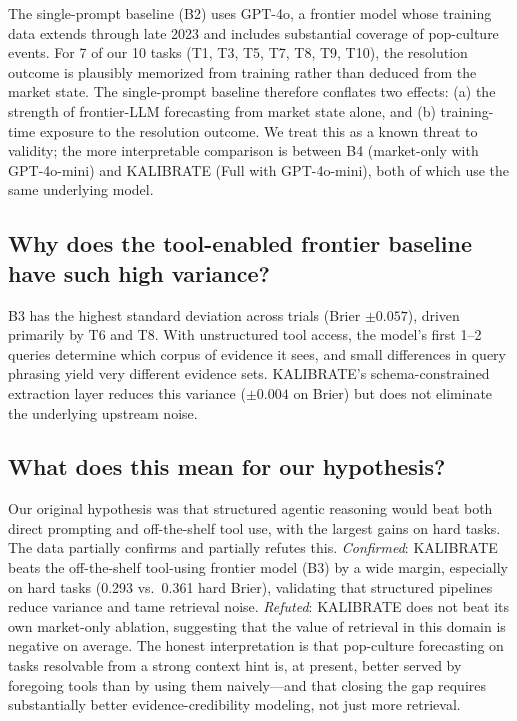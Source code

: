 \documentclass{article} %
\newcommand{\agentname}{KALIBRATE}
\begin{document}
The single-prompt baseline (B2) uses GPT-4o, a frontier model whose training data extends through late 2023 and includes substantial coverage of pop-culture events. For 7 of our 10 tasks (T1, T3, T5, T7, T8, T9, T10), the resolution outcome is plausibly memorized from training rather than deduced from the market state. The single-prompt baseline therefore conflates two effects: (a) the strength of frontier-LLM forecasting from market state alone, and (b) training-time exposure to the resolution outcome. We treat this as a known threat to validity; the more interpretable comparison is between B4 (market-only with GPT-4o-mini) and \agentname{} (Full with GPT-4o-mini), both of which use the same underlying model.

\subsection{Why does the tool-enabled frontier baseline have such high variance?}

B3 has the highest standard deviation across trials (Brier $\pm 0.057$), driven primarily by T6 and T8. With unstructured tool access, the model's first 1--2 queries determine which corpus of evidence it sees, and small differences in query phrasing yield very different evidence sets. \agentname{}'s schema-constrained extraction layer reduces this variance ($\pm 0.004$ on Brier) but does not eliminate the underlying upstream noise.

\subsection{What does this mean for our hypothesis?}

Our original hypothesis was that structured agentic reasoning would beat both direct prompting and off-the-shelf tool use, with the largest gains on hard tasks. The data partially confirms and partially refutes this. \emph{Confirmed}: \agentname{} beats the off-the-shelf tool-using frontier model (B3) by a wide margin, especially on hard tasks (0.293 vs.\ 0.361 hard Brier), validating that structured pipelines reduce variance and tame retrieval noise. \emph{Refuted}: \agentname{} does not beat its own market-only ablation, suggesting that the value of retrieval in this domain is negative on average. The honest interpretation is that pop-culture forecasting on tasks resolvable from a strong context hint is, at present, better served by foregoing tools than by using them naively---and that closing the gap requires substantially better evidence-credibility modeling, not just more retrieval.
\end{document}
